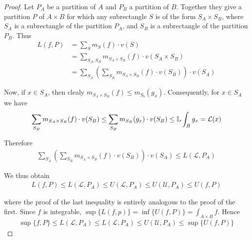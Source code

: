 \begin{proof}
    Let $P_A$ be a partition of $A$ and $P_B$ a partition of $B$.
    Together they give a partition $P$ of $A \times B$ for which any
    subrectangle $S$ is of the form $S_A \times S_B$, where $S_A$ is 
    a subrectangle of the partition $P_A$, and $S_B$ is a subrectangle of the
    partition $P_B$. Thus
    \begin{align*}
        L(f, P)
        & = \sum_{S }^{}{m_S(f)\cdot v(S)} \\
        & = \sum_{S_A, S_B}^{}{m_{S_A\times S_B}(f)\cdot v(S_A\times S_B)} \\
        & = \sum_{S_A}^{}{\left(\sum_{S_B}^{}{m_{S_A\times S_B}(f)\cdot v(S_B)}\right)\cdot v(S_A)} 
    \end{align*}

    Now, if $x\in S_A$, then clealy $m_{S_A\times S_B}(f) \le m_{S_b}(g_x)$. Consequently, for $x\in S_A$
    we have 
    \begin{align*}
        \sum_{S_B}m_{S_A\times S_B}(f)\cdot v(S_B)\leq\sum_{S_B}m_{S_B}(g_x)\cdot v(S_B)\leq\mathbb{L}\int_Bg_x=\mathcal{L}(x)
    \end{align*}

    Therefore 
    \begin{align*}
        \sum_{S_A}\left(\sum_{S_B}m_{S_A\times S_B}(f)\cdot v(S_B)\right)\cdot v(S_A)\leq L(\mathcal{L},P_A)
    \end{align*}

    We thus obtain
    \begin{align*}
        L(f,P)\leq L(\mathcal{L},P_A)\leq U(\mathcal{L},P_A)\leq U(\mathcal{U},P_A)\leq U(f,P)
    \end{align*}

    where the proof of the last inequality is entirely analogous to the proof of the first.
    Since $f$ is integrable, $\sup \{L(f, p)\}=\inf\{U(f, P)\} = \int_{A\times B} f$. Hence 
    \begin{align*}
        \sup\{f, P\} \le L(\mathcal{L},P_A)
        \le L(\mathcal{L},P_A)
        \le U(\mathcal{U},P_A)
        \le \sup\{U(f, P)\}
    \end{align*}
\end{proof}

